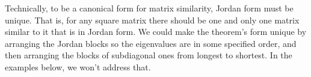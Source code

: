 


\begin{remark}
Technically, to be a canonical form for 
matrix similarity,
Jordan form must be unique.
That is, for any square matrix there should be one and only one 
matrix similar to it that is in Jordan form.
We could make the theorem's form unique 
by arranging the Jordan blocks so the eigenvalues are in 
some specified order, and then arranging
the blocks of subdiagonal ones from 
longest to shortest.
In the examples below, we won't address that.
\end{remark}

